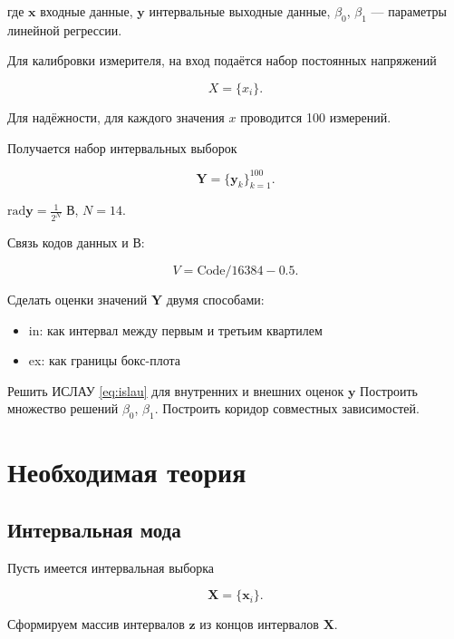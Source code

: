 \documentclass{article}
\begin{document}
  где \( \mathbf{x} \) входные данные, \( \mathbf{y} \) интервальные выходные
  данные, \( \beta_0 \), \( \beta_1 \) --- параметры линейной регрессии.

  Для калибровки измерителя, на вход подаётся набор постоянных
  напряжений

  \begin{equation}
    X = \{ x_i \}.
  \end{equation}

  Для надёжности, для каждого значения \( x \) проводится 100 измерений.

  Получается набор интервальных выборок

  \begin{equation}
    \mathbf{Y} = \{ \mathbf{y}_k \}_{k=1}^{100}.
  \end{equation}

  \( \text{rad} \mathbf{y} = \frac{1}{2^N} \) В, \( N = 14 \).

  Связь кодов данных и В:

  \begin{equation}
    V = \text{Code} / 16384 - 0.5.
  \end{equation}

  Сделать оценки значений \( \mathbf{Y} \) двумя способами:

  \begin{itemize}
    \item in: как интервал между первым и третьим квартилем
    \item ex: как границы бокс-плота
  \end{itemize}

  Решить ИСЛАУ \ref{eq:islau} для внутренних и внешних оценок
  \( \mathbf{y} \)
  Построить множество решений \( \beta_0 \), \( \beta_1 \).
  Построить коридор совместных зависимостей.

  \section{Необходимая теория}

  \subsection{Интервальная мода}

  Пусть имеется интервальная выборка

  \[
    \mathbf{X} = \{ \mathbf{x}_i \}.
  \]

  Сформируем массив интервалов \( \mathbf{z} \) из концов интервалов
  \( \mathbf{X} \).
\end{document}
